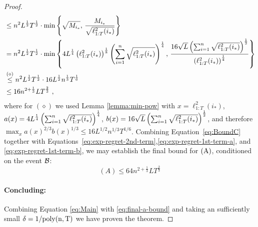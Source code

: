 \begin{proof}
\begin{align}
 & \leq n^2 L^\frac{1}{2}T^\frac{1}{2} \cdot   \min\left\{ \sqrt{M_{i_*}} ,\, \frac{M_{i_*}}{\sqrt{\ell_{1:T}^2(i_*)}} \right\} \nonumber\\
 &=  n^2 L^\frac{1}{2}T^\frac{1}{2} \cdot   \min\left\{4L^\frac{1}{4}  \left(\ell_{1:T}^2(i_*)\right) ^{\frac{1}{8}} \left( \sum_{i=1}^n \sqrt{\ell_{1:T}^2(i_*)}\right)^{\frac{1}{4}}, \, \frac{16\sqrt{L}  \left( \sum_{i=1}^n \sqrt{\ell_{1:T}^2(i_*)}\right)^{\frac{1}{2}}}{\left(\ell_{1:T}^2(i_*)\right) ^{\frac{1}{4}} } \right\}\nonumber\\
 &\overset{(\diamond)}{\leq}  n^2 L^\frac{1}{2}T^\frac{1}{2} \cdot 16 L^{\frac{1}{2}} n^{\frac{1}{3}}  T^{\frac{1}{6}} \nonumber\\
 & \leq 16 n^{2+\frac{1}{3}}L T^\frac{2}{3}~,
 \end{align}
 where for $(\diamond)$ we used Lemma \ref{lemma:min-pow} with $x= {\ell_{1:T}^2(i_*)}$, $a(x)=4L^\frac{1}{4}  \left( \sum_{i=1}^n \sqrt{\ell_{1:T}^2(i_*)}\right)^{\frac{1}{4}}$, \linebreak $b(x)=16\sqrt{L}  \left( \sum_{i=1}^n \sqrt{\ell_{1:T}^2(i_*)}\right)^{\frac{1}{2}}$, and therefore  $\max_x a(x)^{2/3} b(x)^{1/3} \leq 16 L^{1/2} n^{1/3}  T^{1/6}$.
Combining Equation~\eqref{eq:BoundC} together with Equations~\eqref{eq:exp-regret-2nd-term},\eqref{eq:exp-regret-1st-term-a}, and 
\eqref{eq:exp-regret-1st-term-b}, we may  establish the final bound for $\rA$,
conditioned on the event $\mathcal{B}$:
\begin{equation} \label{eq:final-a-bound}
(A) \leq 64 n^{2+\frac{1}{3}}L T^\frac{2}{3}
\end{equation}


\paragraph{Concluding:} 
Combining Equation \eqref{eq:Main} with \eqref{eq:final-a-bound}  and taking an sufficiently small 
$\delta = 1/\rm{poly}(n,T)$ we have proven the theorem.
\end{proof}

